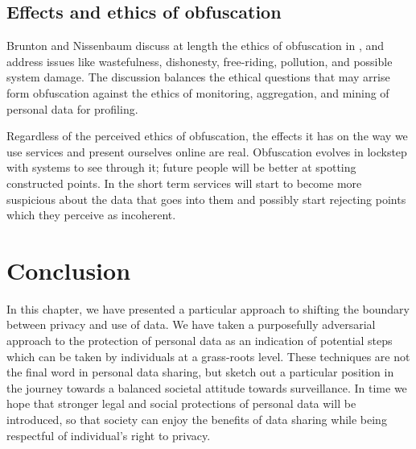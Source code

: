 \documentclass{IOS-Book-Article}     %
\newcommand{\tbox}[3][red]{{
\color{#1}\noindent{
   \fbox{\scriptsize{ {\bf #2} \textsl{#3}}}
   \vspace{2pt}
}
}}
\newcommand{\todo}[1]{\tbox{TODO:}{#1}}
\begin{document}
\subsection{Effects and ethics of obfuscation}
Brunton and Nissenbaum discuss at length the ethics of obfuscation in \cite{brunton2011vernacular}, and address issues like wastefulness, dishonesty, free-riding, pollution, and possible system damage. The discussion balances the ethical questions that may arrise form obfuscation against the ethics of monitoring, aggregation, and mining of personal data for profiling.

Regardless of the perceived ethics of obfuscation, the effects it has on the way we use services and present ourselves online are real. Obfuscation evolves in lockstep with systems to see through it; future people will be better at spotting constructed points. In the short term services will start to become more suspicious about the data that goes into them and possibly start rejecting points which they perceive as incoherent. 


\section{Conclusion}

In this chapter, we have presented a particular approach to shifting the
boundary between privacy and use of data. We have taken a purposefully
adversarial approach to the protection of personal data as an indication of
potential steps which can be taken by individuals at a grass-roots level. 
These techniques are not the final word in personal data sharing, but sketch out
a particular position in the journey towards a balanced societal attitude
towards surveillance.
In
time we hope that stronger legal and social protections of personal data will be
introduced, so that society can enjoy the benefits of data sharing while being
respectful of individual's right to
privacy\cite{rooney2012OpenData,rauhofer2012FutureProofing}. 






\end{document}
